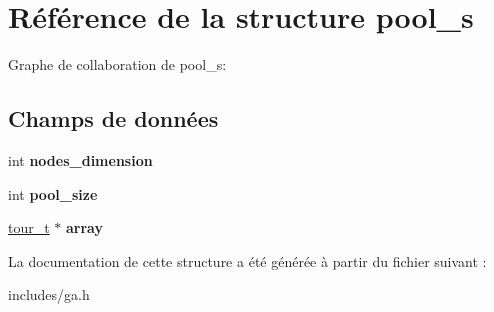\hypertarget{structpool__s}{}\section{Référence de la structure pool\+\_\+s}
\label{structpool__s}


Graphe de collaboration de pool\+\_\+s\+:
\subsection*{Champs de données}
\begin{DoxyCompactItemize}
\item 
\mbox{\label{structpool__s_a6e52d8b3773b74fb4e8b07c05f0f4289}} 
int {\bfseries nodes\+\_\+dimension}
\item 
\mbox{\label{structpool__s_acaa6249be95c0759aaaf42c864f975db}} 
int {\bfseries pool\+\_\+size}
\item 
\mbox{\label{structpool__s_abf25b267227805ce28bb911c07b04730}} 
\hyperlink{structtour__s}{tour\+\_\+t} $\ast$ {\bfseries array}
\end{DoxyCompactItemize}


La documentation de cette structure a été générée à partir du fichier suivant \+:\begin{DoxyCompactItemize}
\item 
includes/ga.\+h\end{DoxyCompactItemize}

